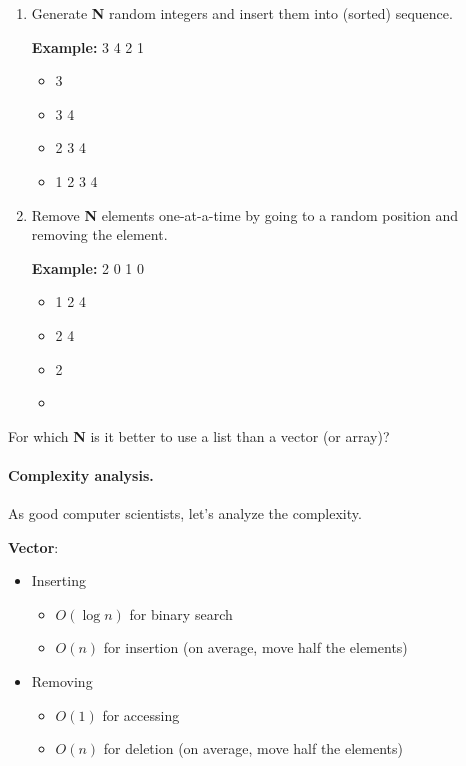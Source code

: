 \begin{enumerate}
\item Generate {\bf N} random integers and insert them into (sorted)
      sequence.
      
      {\bf Example:} 3 4 2 1
      
      \begin{itemize}
        \item 3
        \item 3 4
        \item 2 3 4
        \item 1 2 3 4
      \end{itemize}

\item Remove {\bf N} elements one-at-a-time by going to a random position
      and removing the element.

      {\bf Example:} 2 0 1 0
      
      \begin{itemize}
        \item 1 2 4
        \item 2 4
        \item 2
        \item 
      \end{itemize}
\end{enumerate}

For which {\bf N} is it better to use a list than a vector (or array)?

 
\paragraph{Complexity analysis.} As good computer scientists, let's analyze
the complexity.  

{\bf Vector}:\\[-2em]
      \begin{itemize}
        \item Inserting\\[-2em]
          \begin{itemize}
            \item $O(\log n)$ for binary search
            \item $O(n)$ for insertion (on average, move half the elements)
          \end{itemize}
        \item Removing\\[-2em]
          \begin{itemize}
            \item $O(1)$ for accessing
            \item $O(n)$ for deletion (on average, move half the elements)
          \end{itemize}
      \end{itemize}


